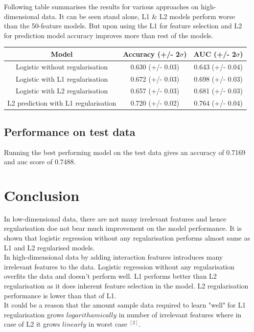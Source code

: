 \documentclass[paper=a4,fontsize=12pt]{article}
\begin{document}
Following table summarises the results for various approaches on high-dimensional data. It can be seen stand alone, L1 \& L2 models perform worse than the 50-feature models. But upon using the L1 for feature selection and L2 for prediction model accuracy improves more than rest of the models.

\begin{center}
\large
\begin{tabular}{ | c | c | c | } 
\hline
Model & Accuracy (+/- 2$\sigma$) & AUC (+/- 2$\sigma$) \\ 
\hline
Logistic without regularisation & 0.630 (+/- 0.03) & 0.643 (+/- 0.04)\\ 
Logistic with L1 regularisation & 0.672 (+/- 0.03) & 0.698 (+/- 0.03) \\ 
Logistic with L2 regularisation & 0.657 (+/- 0.03) & 0.681 (+/- 0.03) \\ 
L2 prediction with L1 regularisation & 0.720 (+/- 0.02) & 0.764 (+/- 0.04) \\ 
\hline
\end{tabular}
\end{center}


\subsection{Performance on test data}
Running the best performing model on the test data gives an accuracy of 0.7169 and auc score of 0.7488.


\section{Conclusion}
In low-dimensional data, there are not many irrelevant features and hence regularisation doe not bear much improvement on the model performance. It is shown that logistic regression without any regularisation performs almost same as L1 and L2 regularised models.\\

In high-dimensional data by adding interaction features introduces many irrelevant features to the data. Logistic regression without any regularisation overfits the data and doesn't perform well. L1 performs better than L2 regularisation as it does inherent feature selection in the model. L2 regularisation performance is lower than that of L1.\\ 

It could be a reason that the amount sample data required to learn "well" for L1 regularisation grows $logarithamically$ in number of irrelevant features where in case of L2 it grows $linearly$ in worst case $^{[2]}$.\\
\end{document}
